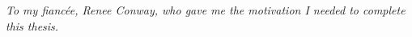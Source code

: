 \begin{center}
\emph{To my fianc\'ee, Renee Conway, who gave me the motivation I needed to complete this thesis.}
\end{center}
